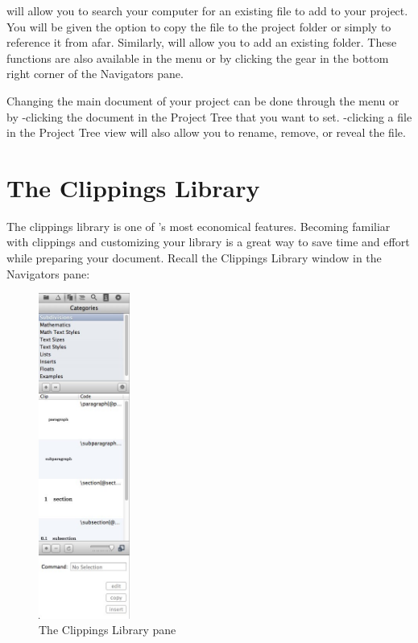 
 will allow you to search your computer for an existing file to add to your project. You will be given the option to copy the file to the project folder or simply to reference it from afar. Similarly,  will allow you to add an existing folder. These functions are also available in the  menu or by clicking the gear in the bottom right corner of the Navigators pane.

Changing the main document of your project can be done through the  menu or by \cmdkey-clicking the document in the Project Tree that you want to set. \cmdkey-clicking a file in the Project Tree view will also allow you to rename, remove, or reveal the file.

\section[Clippings Library]{The Clippings Library}
\label{reference.clippings}
The clippings library is one of \texnicle's most economical features. Becoming familiar with clippings and customizing your library is a great way to save time and effort while preparing your document. Recall the Clippings Library window in the Navigators pane:
\begin{figure}[ht]
\centering
\includegraphics[width=3cm]{TeXnicle-Images/texnicle-clippingslibrary.jpg}
\caption{The Clippings Library pane}
\label{fig:texnicle-clippingslibrary2}
\end{figure}

